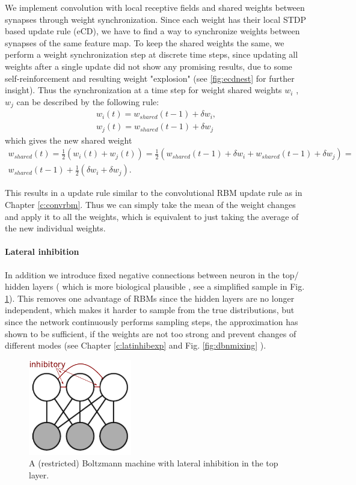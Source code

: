 We implement convolution with local receptive fields and shared weights between synapses through weight synchronization.
Since each weight has their local STDP based update rule (eCD), we have to find a way to synchronize weights between synapses of the same feature map.
To keep the shared weights the same, we perform a weight synchronization step at discrete time steps, since updating all weights after a single update did not show any promising results, due to some self-reinforcement and resulting weight "explosion" (see \ref{fig:ecdnest} for further insight).
Thus the synchronization at a time step for weight shared weights $w_i$ , $w_j$ can be described by the following rule:  
\[
\begin{split}
w_i(t) = w_{shared}(t-1) + \delta w_i, \\ 
w_j(t) = w_{shared}(t-1) + \delta w_j 
\end{split}
\]
which gives the new shared weight
\[
\begin{split}
w_{shared}(t) = \frac{1}{2} (w_i(t) + w_j(t) ) = \frac{1}{2} (w_{shared}(t-1) + \delta w_i + w_{shared}(t-1) + \delta w_j) = \\ w_{shared}(t-1) + \frac{1}{2} (\delta w_i + \delta w_j).
\end{split}
\]

This results in a update rule similar to the convolutional RBM update rule as in Chapter \ref{c:convrbm}.
Thus we can simply take the mean of the weight changes and apply it to all the weights, which is equivalent to just taking the average of the new individual weights. 

\paragraph{Lateral inhibition} \label{c:latinhib}
In addition we introduce fixed negative connections between neuron in the top/ hidden layers ( which is more biological plausible \cite{King2013} , see a simplified sample in Fig. \ref{fig:bminhib}).
This removes one advantage of RBMs since the hidden layers are no longer independent, which makes it harder to sample from the true distributions, but since the network continuously performs sampling steps, the approximation has shown to be sufficient, if the weights are not too strong and prevent changes of different modes (see Chapter \ref{c:latinhibexp} and Fig. \ref{fig:dbnmixing} ).

\begin{figure}
	\centering
    	\includegraphics[width=0.4\textwidth]{imgs/lateral_inhib.png} 
    \caption{A (restricted) Boltzmann machine with lateral inhibition in the top layer.}
	\label{fig:bminhib}
\end{figure}


